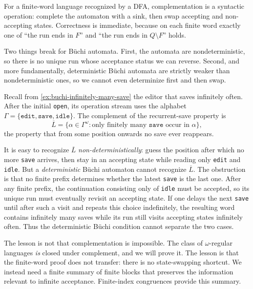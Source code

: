 For a finite-word language recognized by a DFA, complementation is a
syntactic operation: complete the automaton with a sink, then swap
accepting and non-accepting states.  Correctness is immediate, because
on each finite word exactly one of ``the run ends in $F$'' and ``the run
ends in $Q\setminus F$'' holds.

Two things break for B\"uchi automata.  First, the automata are
nondeterministic, so there is no unique run whose acceptance status we
can reverse.
Second, and more fundamentally, deterministic B\"uchi automata are
strictly weaker than nondeterministic ones, so we cannot even
determinize first and then swap.

\begin{example}
\label{ex:det-buchi-gap}
Recall from \cref{ex:buchi-infinitely-many-save} the editor that saves
infinitely often.  After the initial \texttt{open}, its operation stream
uses the alphabet
$\Gamma=\{\texttt{edit},\texttt{save},\texttt{idle}\}$.  The complement
of the recurrent-save property is
\[
  \overline{L}=\{\alpha\in\Gamma^\omega :
                 \text{only finitely many }\texttt{save}
                 \text{ occur in }\alpha\},
\]
the property that from some position onwards no save ever reappears.

It is easy to recognize $\overline{L}$ \emph{non-deterministically}:
guess the position after which no more \texttt{save} arrives, then stay
in an accepting state while reading only \texttt{edit} and
\texttt{idle}.  But a
\emph{deterministic} B\"uchi automaton cannot recognize $\overline{L}$.
The obstruction is that no finite prefix determines whether the latest
\texttt{save} is the last one.  After any finite prefix, the continuation
consisting only of \texttt{idle} must be accepted, so its unique run must
eventually revisit an accepting state.  If one delays the next
\texttt{save} until after such a visit and repeats this choice
indefinitely, the resulting word contains infinitely many
saves while its run still visits accepting states infinitely
often.  Thus the deterministic B\"uchi condition cannot separate the
two cases.
\end{example}

The lesson is not that complementation is impossible.  The class of
$\omega$-regular languages \emph{is} closed under complement, and we
will prove it.  The lesson is that the finite-word proof does not
transfer: there is no state-swapping shortcut.  We instead need a finite
summary of finite blocks that preserves the information relevant to
infinite acceptance.  Finite-index congruences provide this summary.

